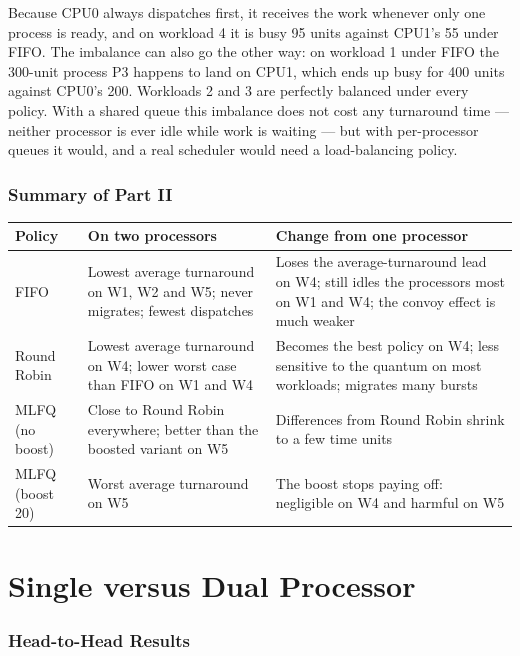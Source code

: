 \documentclass[11pt,a4paper]{article}
\begin{document}
Because CPU0 always dispatches first, it receives the work whenever only one process is
ready, and on workload 4 it is busy 95 units against CPU1's 55 under FIFO. The imbalance can
also go the other way: on workload 1 under FIFO the 300-unit process P3 happens to land on
CPU1, which ends up busy for 400 units against CPU0's 200. Workloads 2 and 3 are perfectly
balanced under every policy. With a shared queue this imbalance does not cost any turnaround time --- neither
processor is ever idle while work is waiting --- but with per-processor queues it would, and
a real scheduler would need a load-balancing policy.

\section{Summary of Part II}

\begin{center}\small
\begin{tabular}{l>{\raggedright\arraybackslash}p{5.3cm}>{\raggedright\arraybackslash}p{5.9cm}}
\toprule
\textbf{Policy} & \textbf{On two processors} & \textbf{Change from one processor}\\
\midrule
FIFO & Lowest average turnaround on W1, W2 and W5; never migrates; fewest dispatches &
Loses the average-turnaround lead on W4; still idles the processors most on W1 and W4;
the convoy effect is much weaker \\ \addlinespace
Round Robin & Lowest average turnaround on W4; lower worst case than FIFO on W1 and W4 &
Becomes the best policy on W4; less sensitive to the quantum on most workloads; migrates
many bursts \\
\addlinespace
MLFQ (no boost) & Close to Round Robin everywhere; better than the boosted variant on W5 &
Differences from Round Robin shrink to a few time units \\ \addlinespace
MLFQ (boost 20) & Worst average turnaround on W5 & The boost stops paying off: negligible on
W4 and harmful on W5 \\
\bottomrule
\end{tabular}
\end{center}
\newpage\part{Single versus Dual Processor}
\section{Head-to-Head Results}
\end{document}
